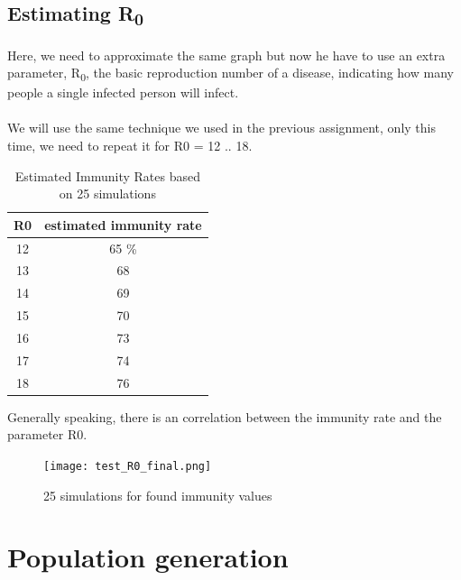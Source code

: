 \documentclass[runningheads]{llncs}
\begin{document}
	\subsection{Estimating R\textsubscript{0}}
	Here, we need to approximate the same graph but now he have to use an extra parameter, R\textsubscript{0}, the basic reproduction number of a disease, indicating how many people a single infected person will infect.
	\\
	\\
	\noindent
	We will use the same technique we used in the previous assignment, only this time, we need to repeat it for R0 = 12 .. 18.
	
	\begin{table}
		\begin{center}
			
			\begin{tabular}{c||c}
				R0 & estimated immunity rate \\ \hline
				12 & 65	\% \\
				13 & 68 \\
				14 & 69 \\
				15 & 70 \\
				16 & 73 \\
				17 & 74 \\
				18 & 76 \\
			\end{tabular}
			\caption{Estimated Immunity Rates based on 25 simulations}
		\end{center}
		
	\end{table}
	
	Generally speaking, there is an correlation between the immunity rate and the parameter R0.
	
	\begin{figure}
		\texttt{[image: test\_R0\_final.png]}
		\caption{25 simulations for found immunity values} 
	\end{figure}
	
	\newpage
	\noindent
	\section{Population generation}
	
\end{document}
